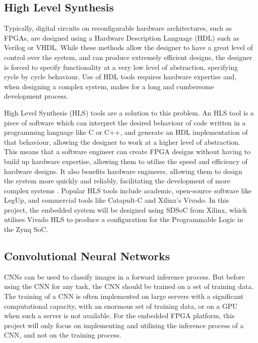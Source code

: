 \documentclass[12pt]{article}
\begin{document}
\subsection{High Level Synthesis}
\label{sec:Background-HLS}


Typically, digital circuits on reconfigurable hardware architectures, such as FPGAs, are designed using a Hardware Description Language (HDL) such as Verilog or VHDL. While these methods allow the designer to have a great level of control over the system, and can produce extremely efficient designs, the designer is forced to specify functionality at a very low level of abstraction, specifying cycle by cycle behaviour. Use of HDL tools requires hardware expertise and, when designing a complex system, makes for a long and cumbersome development process.

High Level Synthesis (HLS) tools are a  solution to this problem. An HLS tool is a piece of software which can interpret the desired behaviour of code written in a programming language like C or C++, and generate an HDL implementation of that behaviour, allowing the designer to work at a higher level of abstraction. This means that a software engineer can create FPGA designs without having to build up hardware expertise, allowing them to utilise the speed and efficiency of hardware designs. It also benefits hardware engineers, allowing them to design the system more quickly and reliably, facilitating the development of more complex systems \cite{HLS}. Popular HLS tools include academic, open-source software like LegUp, and commercial tools like Catapult-C and Xilinx's Vivado. In this project, the embedded system will be designed using SDSoC from Xilinx, which utilises Vivado HLS to produce a configuration for the Programmable Logic in the Zynq SoC.

\subsection{Convolutional Neural Networks}
\label{sec:Background-CNN}


CNNs can be used to classify images in a forward inference process. But before using the CNN for any task, the CNN should be trained on a set of training data. The training of a CNN is often implemented on large servers with a significant computational capacity, with an enormous set of training data, or on a GPU when such a server is not available. For the embedded FPGA platform, this project will only focus on implementing and utilising the inference process of a CNN, and not on the training process.
\end{document}
